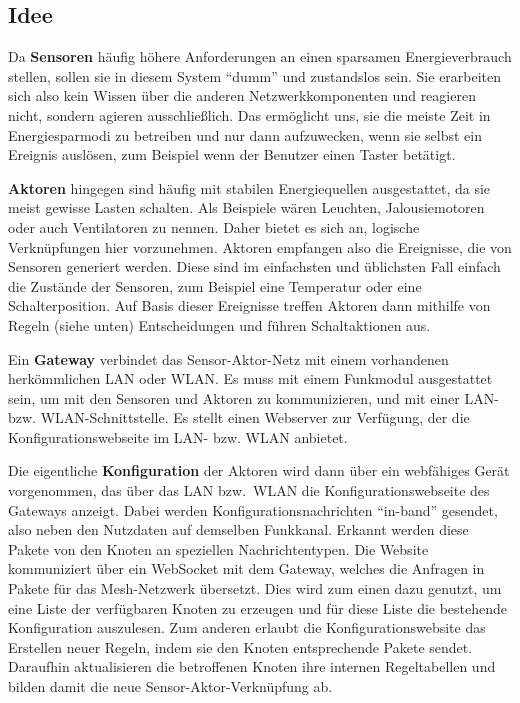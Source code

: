 \documentclass[conference]{IEEEtran}
\begin{document}
    \subsection{Idee}
        Da \textbf{Sensoren} häufig höhere Anforderungen an einen sparsamen
        Energieverbrauch stellen, sollen sie in diesem System \enquote{dumm} und zustandslos sein.
        Sie erarbeiten sich also kein Wissen über die anderen Netzwerkkomponenten
        und reagieren nicht, sondern agieren ausschließlich.
        Das ermöglicht uns, sie die meiste Zeit in Energiesparmodi zu betreiben
        und nur dann aufzuwecken, wenn sie selbst ein Ereignis auslösen,
        zum Beispiel wenn der Benutzer einen Taster betätigt.

        \textbf{Aktoren} hingegen sind häufig mit stabilen Energiequellen
        ausgestattet, da sie meist gewisse Lasten schalten.
        Als Beispiele wären Leuchten, Jalousiemotoren oder auch Ventilatoren
        zu nennen.
        Daher bietet es sich an, logische Verknüpfungen hier vorzunehmen.
        Aktoren empfangen also die Ereignisse, die von Sensoren generiert werden.
        Diese sind im einfachsten und üblichsten Fall einfach die Zustände
        der Sensoren, zum Beispiel eine Temperatur oder eine Schalterposition.
        Auf Basis dieser Ereignisse treffen Aktoren dann mithilfe von
        Regeln (siehe unten) Entscheidungen und führen Schaltaktionen aus.

        Ein \textbf{Gateway} verbindet das Sensor-Aktor-Netz mit einem
        vorhandenen herkömmlichen \ac{LAN} oder \ac{WLAN}.
        Es muss mit einem Funkmodul ausgestattet sein,
        um mit den Sensoren und Aktoren zu kommunizieren,
        und mit einer \ac{LAN}- bzw. \ac{WLAN}-Schnittstelle.
        Es stellt einen Webserver zur Verfügung,
        der die Konfigurationswebseite im \ac{LAN}- bzw. \ac{WLAN} anbietet.

        Die eigentliche \textbf{Konfiguration} der Aktoren wird dann
        über ein webfähiges Gerät vorgenommen,
        das über das \ac{LAN} bzw.\ \ac{WLAN} die
        Konfigurationswebseite des Gateways anzeigt.
        Dabei werden Konfigurationsnachrichten \enquote{in-band} gesendet,
        also neben den Nutzdaten auf demselben Funkkanal. Erkannt werden
        diese Pakete von den Knoten an speziellen Nachrichtentypen.
        Die Website kommuniziert über ein WebSocket mit dem Gateway, welches die Anfragen
        in Pakete für das Mesh-Netzwerk übersetzt. Dies wird zum einen
        dazu genutzt, um eine Liste der verfügbaren Knoten zu erzeugen und für diese
        Liste die bestehende Konfiguration auszulesen. Zum anderen erlaubt die Konfigurationswebsite
        das Erstellen neuer Regeln, indem sie den Knoten entsprechende Pakete sendet.
        Daraufhin aktualisieren die betroffenen Knoten ihre internen Regeltabellen und bilden
        damit die neue Sensor-Aktor-Verknüpfung ab.
\end{document}
